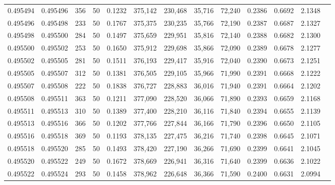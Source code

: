 \begin{tabular}{rrrrrrrrrrrrr}
0.495494 & 0.495496 &   356 &  50 &                                     0.1232 & 375,142 & 230,468 &  35,716 &  72,240 & 0.2386 & 0.6692 & 2.1348 \\
0.495496 & 0.495498 &   233 &  50 &                                     0.1767 & 375,375 & 230,235 &  35,766 &  72,190 & 0.2387 & 0.6687 & 2.1327 \\
0.495498 & 0.495500 &   284 &  50 &                                     0.1497 & 375,659 & 229,951 &  35,816 &  72,140 & 0.2388 & 0.6682 & 2.1300 \\
0.495500 & 0.495502 &   253 &  50 &                                     0.1650 & 375,912 & 229,698 &  35,866 &  72,090 & 0.2389 & 0.6678 & 2.1277 \\
0.495502 & 0.495505 &   281 &  50 &                                     0.1511 & 376,193 & 229,417 &  35,916 &  72,040 & 0.2390 & 0.6673 & 2.1251 \\
0.495505 & 0.495507 &   312 &  50 &                                     0.1381 & 376,505 & 229,105 &  35,966 &  71,990 & 0.2391 & 0.6668 & 2.1222 \\
0.495507 & 0.495508 &   222 &  50 &                                     0.1838 & 376,727 & 228,883 &  36,016 &  71,940 & 0.2391 & 0.6664 & 2.1202 \\
0.495508 & 0.495511 &   363 &  50 &                                     0.1211 & 377,090 & 228,520 &  36,066 &  71,890 & 0.2393 & 0.6659 & 2.1168 \\
0.495511 & 0.495513 &   310 &  50 &                                     0.1389 & 377,400 & 228,210 &  36,116 &  71,840 & 0.2394 & 0.6655 & 2.1139 \\
0.495513 & 0.495516 &   366 &  50 &                                     0.1202 & 377,766 & 227,844 &  36,166 &  71,790 & 0.2396 & 0.6650 & 2.1105 \\
0.495516 & 0.495518 &   369 &  50 &                                     0.1193 & 378,135 & 227,475 &  36,216 &  71,740 & 0.2398 & 0.6645 & 2.1071 \\
0.495518 & 0.495520 &   285 &  50 &                                     0.1493 & 378,420 & 227,190 &  36,266 &  71,690 & 0.2399 & 0.6641 & 2.1045 \\
0.495520 & 0.495522 &   249 &  50 &                                     0.1672 & 378,669 & 226,941 &  36,316 &  71,640 & 0.2399 & 0.6636 & 2.1022 \\
0.495522 & 0.495524 &   293 &  50 &                                     0.1458 & 378,962 & 226,648 &  36,366 &  71,590 & 0.2400 & 0.6631 & 2.0994 \\

\end{tabular}
